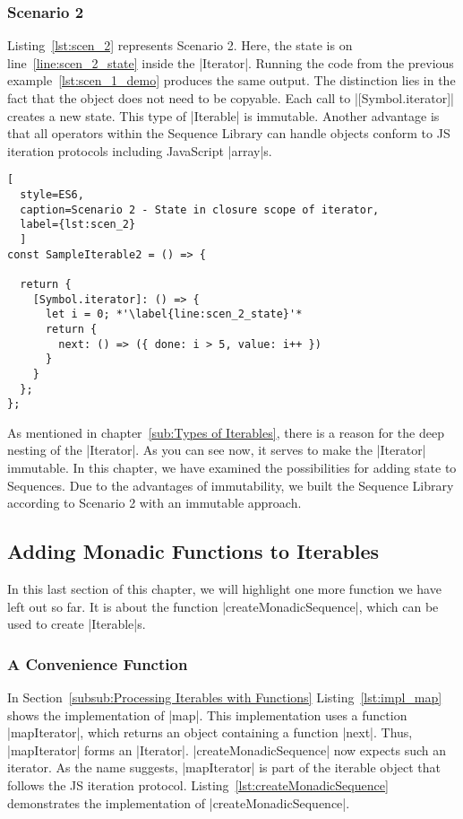 \subsubsection{Scenario 2}
Listing~\ref{lst:scen_2} represents Scenario 2. Here, the state is on
line~\ref{line:scen_2_state} inside the |Iterator|. Running the code from the previous 
example~\ref{lst:scen_1_demo} produces the same output. The distinction lies in
the fact that the object does not need to be copyable. Each call to |[Symbol.iterator]| 
creates a new state. This type of |Iterable| is immutable. Another advantage is
that all operators within the Sequence Library can handle objects conform to JS
iteration protocols including JavaScript |array|s.

\begin{lstlisting}[
  style=ES6, 
  caption=Scenario 2 - State in closure scope of iterator,
  label={lst:scen_2}
  ]
const SampleIterable2 = () => {

  return {
    [Symbol.iterator]: () => {
      let i = 0; *'\label{line:scen_2_state}'*
      return {
        next: () => ({ done: i > 5, value: i++ })
      }
    }
  };
};
\end{lstlisting}

As mentioned in chapter~\ref{sub:Types of Iterables}, there is a reason for 
the deep nesting of the |Iterator|. As you can see now, it serves to make 
the |Iterator| immutable.
\newline
In this chapter, we have examined the possibilities for adding state to 
Sequences. Due to the advantages of immutability, we built the Sequence Library 
according to Scenario 2 with an immutable approach.


\subsection{Adding Monadic Functions to Iterables}
\label{sub:Adding Monadic Functions to Iterables}
In this last section of this chapter, we will highlight one more function we 
have left out so far. It is about the function |createMonadicSequence|, which
can be used to create |Iterable|s.

\subsubsection{A Convenience Function}
\label{subsub:A Convenience Function}
In Section~\ref{subsub:Processing Iterables with Functions}
Listing~\ref{lst:impl_map} shows the implementation of |map|. 
This implementation uses a function |mapIterator|, which returns an object
containing a function |next|. Thus, |mapIterator| forms an |Iterator|.
|createMonadicSequence| now expects such an iterator. As the name suggests, 
|mapIterator| is part of the 
iterable object that follows the JS iteration protocol.
Listing~\ref{lst:createMonadicSequence} demonstrates the implementation of 
|createMonadicSequence|.

